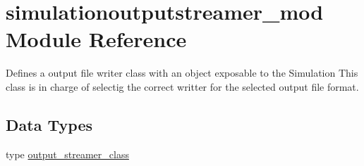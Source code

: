 \hypertarget{namespacesimulationoutputstreamer__mod}{}\section{simulationoutputstreamer\+\_\+mod Module Reference}
\label{namespacesimulationoutputstreamer__mod}


Defines a output file writer class with an object exposable to the Simulation This class is in charge of selectig the correct writter for the selected output file format.  


\subsection*{Data Types}
\begin{DoxyCompactItemize}
\item 
type \mbox{\hyperlink{structsimulationoutputstreamer__mod_1_1output__streamer__class}{output\+\_\+streamer\+\_\+class}}
\end{DoxyCompactItemize}
